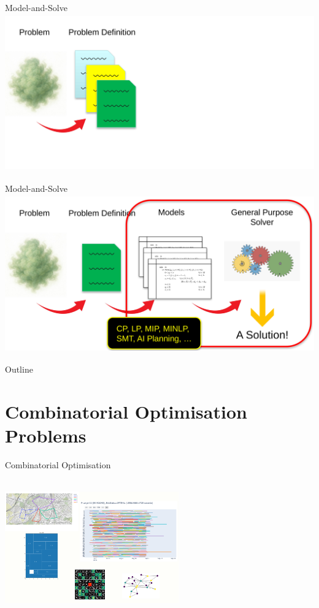 \documentclass{cons-beamer}
\begin{document}
\begin{frame}{Model-and-Solve}
  \centering
  \includegraphics[height=68mm]{images/prob2def}
\end{frame}
\begin{frame}{Model-and-Solve}
  \centering
  \includegraphics[height=68mm]{images/prob2sol}
\end{frame}

\begin{frame}{Outline}
  \tableofcontents
\end{frame}

\section{Combinatorial Optimisation Problems}

\begin{frame}{Combinatorial Optimisation}
  \begin{center}
    ~ \\
    \includegraphics[height=48mm]{images/CO_examples} \\
    ~ \\
  \end{center}
\end{frame}
\end{document}
